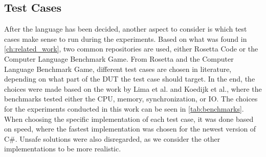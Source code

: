 \subsection{Test Cases}

After the language has been decided, another aspect to consider is which test cases make sense to run during the experiments. Based on what was found in \cref{ch:related_work}, two common repositories are used, either Rosetta Code\cite[]{rosetta_code} or the Computer Language Benchmark Game\cite[]{benchmark_game}. From Rosetta and the Computer Language Benchmark Game, different test cases are chosen in literature, depending on what part of the DUT the test case should target. In the end, the choices were made based on the work by Lima et al.\cite[]{greenland2016statistical} and Koedijk et al.\cite[]{Koedijk2022diff}, where the benchmarks tested either the CPU, memory, synchronization, or IO. The choices for the experiments conducted in this work can be seen in \cref{tab:benchmarks}. When choosing the specific implementation of each test case, it was done based on speed, where the fastest implementation was chosen for the newest version of C\#. Unsafe solutions were also disregarded, as we consider the other implementations to be more realistic.


